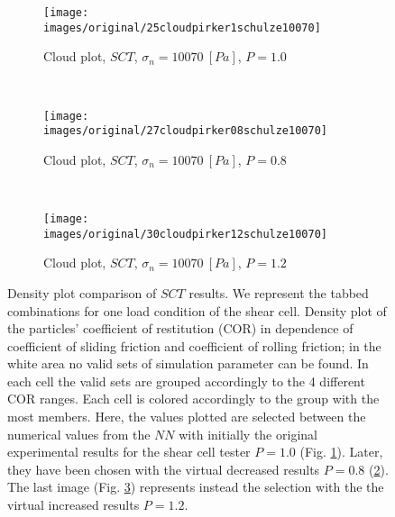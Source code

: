 \begin{figure}[htp] \centering
    \begin{subfigure}[b]{2cm}
        \texttt{[image: images/original/25cloudpirker1schulze10070]}
        \caption{Cloud plot, $SCT$, $\sigma_n=10070 ~[Pa]$, $P=1.0$}
        \label{fig:25cloudpirker1schulze10070}
    \end{subfigure}\\
    \begin{subfigure}[b]{2cm}
        \texttt{[image: images/original/27cloudpirker08schulze10070]}
        \caption{Cloud plot, $SCT$, $\sigma_n=10070 ~[Pa]$, $P=0.8$}
        \label{fig:27cloudpirker08schulze10070} 
    \end{subfigure}\\
    \begin{subfigure}[b]{2cm}
        \texttt{[image: images/original/30cloudpirker12schulze10070]}
        \caption{Cloud plot, $SCT$, $\sigma_n=10070 ~[Pa]$, $P=1.2$}
        \label{fig:30cloudpirker12schulze10070} 
    \end{subfigure}
    \caption[Density plot comparison of SCT results]{Density plot comparison of
    $SCT$ results. We represent the tabbed combinations for one load condition
    of the shear cell. 
    Density plot of the particles' coefficient of restitution (COR) in dependence
	of coefficient of sliding friction and coefficient of rolling friction; in the
	white area no valid sets of simulation parameter can be found.
	In each cell the valid sets are grouped accordingly to the 4 different COR
	ranges.
	Each cell is colored accordingly to the group with the most members. 
    Here, the values plotted are selected between the numerical
    values from the $NN$ with initially the original experimental results for the shear cell tester $P=1.0$ (Fig.
    \ref{fig:25cloudpirker1schulze10070}). 
        Later, they have been chosen with  
    the virtual decreased results $P=0.8$
    (\ref{fig:27cloudpirker08schulze10070}).
    The last image (Fig. \ref{fig:30cloudpirker12schulze10070}) represents
    instead the selection with the the virtual increased results $P=1.2$.    }
    \label{fig:29schulzeradarandcloud}
\end{figure}